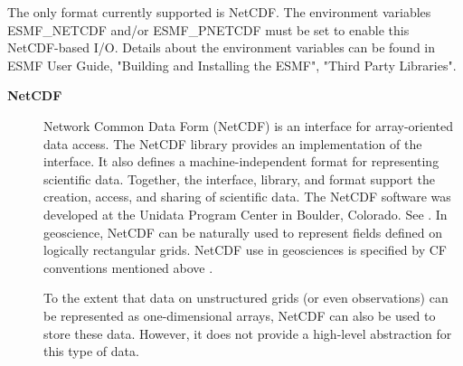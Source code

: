 The only format currently supported is NetCDF. The environment variables
ESMF\_NETCDF and/or ESMF\_PNETCDF must be set to enable this NetCDF-based I/O.
Details about the environment variables can be found in ESMF User Guide,
"Building and Installing the ESMF", "Third Party Libraries".

\begin{description}
\item[\bf NetCDF] Network Common Data Form (NetCDF) is an interface for 
array-oriented data access. The NetCDF library provides an
implementation of the interface. It also defines a 
machine-independent format for representing scientific data. Together,
the interface, library, and format support the creation, access, and
sharing of scientific data. The NetCDF software was developed at the
Unidata Program Center in Boulder, Colorado. See \cite{NetCDF3_UsersGuide_C}.
In geoscience, NetCDF can be naturally used to represent fields
defined on logically rectangular grids. NetCDF use in geosciences is 
specified by CF conventions mentioned above \cite{NetCDF_CF}.

To the extent that data on unstructured grids (or even observations) can be 
represented as one-dimensional arrays, NetCDF can also be used to store these 
data. However, it does not provide a high-level abstraction for this type of 
data. 

\end{description}

